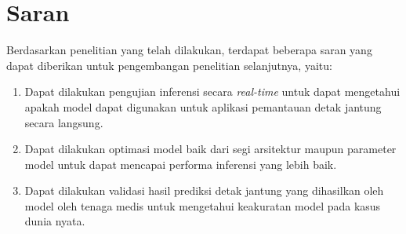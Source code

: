 \section{Saran}
Berdasarkan penelitian yang telah dilakukan, terdapat beberapa saran yang dapat diberikan untuk pengembangan penelitian selanjutnya, yaitu:
\begin{enumerate}[leftmargin=0.5cm]
  \item Dapat dilakukan pengujian inferensi secara \textit{real-time} untuk dapat mengetahui apakah model dapat digunakan untuk aplikasi pemantauan detak jantung secara langsung.
  \item Dapat dilakukan optimasi model baik dari segi arsitektur maupun parameter model untuk dapat mencapai performa inferensi yang lebih baik.
  \item Dapat dilakukan validasi hasil prediksi detak jantung yang dihasilkan oleh model oleh tenaga medis untuk mengetahui keakuratan model pada kasus dunia nyata.
\end{enumerate}
